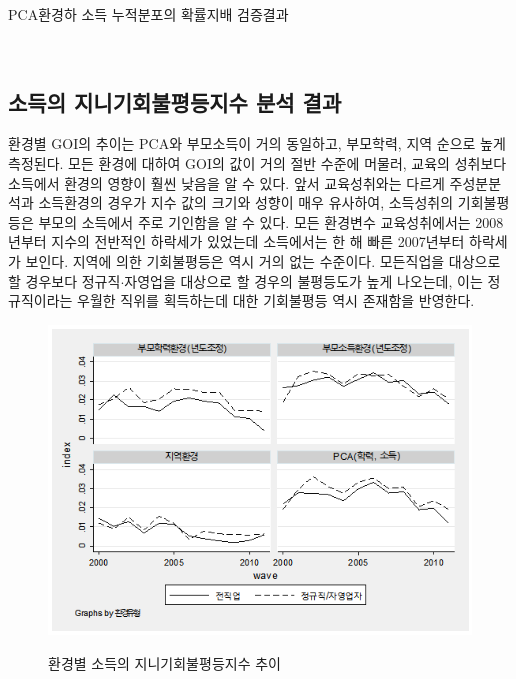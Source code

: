 \begin{table}[htbp]
    \centering
    \caption{PCA환경하 소득 누적분포의 확률지배 검증결과}
    
    \\
    \label{tab:gomse_dom_byrgn}
\end{table}

\subsection{소득의 지니기회불평등지수 분석 결과}
환경별 GOI의 추이는 PCA와 부모소득이 거의 동일하고, 부모학력, 지역 순으로 높게 측정된다.
모든 환경에 대하여 GOI의 값이 거의 절반 수준에 머물러, 교육의 성취보다 소득에서 환경의 영향이 훨씬 낮음을 알 수 있다.
앞서 교육성취와는 다르게 주성분분석과 소득환경의 경우가 지수 값의 크기와 성향이 매우 유사하여, 소득성취의 기회불평등은 부모의 소득에서 주로 기인함을 알 수 있다.
모든 환경변수 교육성취에서는 2008년부터 지수의 전반적인 하락세가 있었는데 소득에서는 한 해 빠른 2007년부터 하락세가 보인다.
지역에 의한 기회불평등은 역시 거의 없는 수준이다.
모든직업을 대상으로 할 경우보다 정규직$\cdot$자영업을 대상으로 할 경우의 불평등도가 높게 나오는데, 이는 정규직이라는 우월한 직위를 획득하는데 대한 기회불평등 역시 존재함을 반영한다.

\begin{figure}
    \centering
    \caption{환경별 소득의 지니기회불평등지수 추이}
    \includegraphics[width=\textwidth]{figure/gomse_goi_byenv.png}
    \label{fig:gomse_goi_byenv}
\end{figure}

